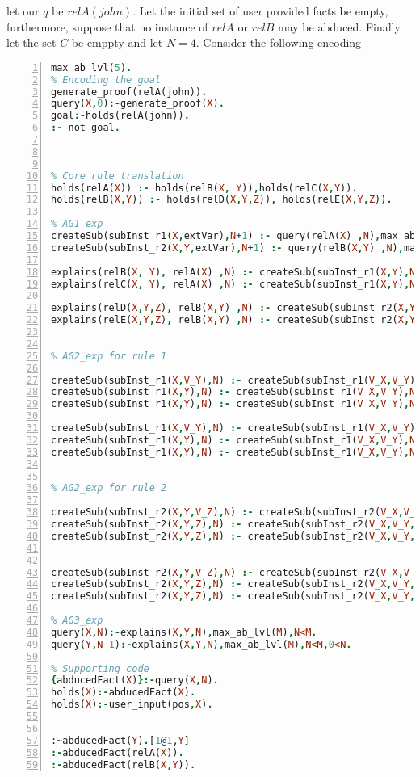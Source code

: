 \documentclass[sigconf]{acmart}
\begin{document}
let our $q$ be $relA(john)$. Let the initial set of user provided facts be empty, furthermore, suppose that no instance of $relA$ or $relB$ may be abduced. Finally let the set $C$ be emppty and let $N=4$.  
Consider the following encoding
\begin{lstlisting}[language=Prolog, numbers=left]
max_ab_lvl(5).
% Encoding the goal
generate_proof(relA(john)).
query(X,0):-generate_proof(X).
goal:-holds(relA(john)).
:- not goal.



% Core rule translation
holds(relA(X)) :- holds(relB(X, Y)),holds(relC(X,Y)).
holds(relB(X,Y)) :- holds(relD(X,Y,Z)), holds(relE(X,Y,Z)).

% AG1_exp
createSub(subInst_r1(X,extVar),N+1) :- query(relA(X) ,N),max_ab_lvl(M),N<M-1.
createSub(subInst_r2(X,Y,extVar),N+1) :- query(relB(X,Y) ,N),max_ab_lvl(M),N<M-1.

explains(relB(X, Y), relA(X) ,N) :- createSub(subInst_r1(X,Y),N).
explains(relC(X, Y), relA(X) ,N) :- createSub(subInst_r1(X,Y),N).

explains(relD(X,Y,Z), relB(X,Y) ,N) :- createSub(subInst_r2(X,Y,Z),N).
explains(relE(X,Y,Z), relB(X,Y) ,N) :- createSub(subInst_r2(X,Y,Z),N).


% AG2_exp for rule 1

createSub(subInst_r1(X,V_Y),N) :- createSub(subInst_r1(V_X,V_Y),N), holds(relA(X)).
createSub(subInst_r1(X,Y),N) :- createSub(subInst_r1(V_X,V_Y),N), holds(relB(X,Y)).
createSub(subInst_r1(X,Y),N) :- createSub(subInst_r1(V_X,V_Y),N), holds(relC(X,Y)).

createSub(subInst_r1(X,V_Y),N) :- createSub(subInst_r1(V_X,V_Y),N), query(relA(X),N-1),0<N.
createSub(subInst_r1(X,Y),N) :- createSub(subInst_r1(V_X,V_Y),N), query(relB(X,Y),N).
createSub(subInst_r1(X,Y),N) :- createSub(subInst_r1(V_X,V_Y),N), query(relC(X,Y),N).


% AG2_exp for rule 2

createSub(subInst_r2(X,Y,V_Z),N) :- createSub(subInst_r2(V_X,V_Y,V_Z),N), holds(relB(X,Y)).
createSub(subInst_r2(X,Y,Z),N) :- createSub(subInst_r2(V_X,V_Y,V_Z),N), holds(relD(X,Y,Z)).
createSub(subInst_r2(X,Y,Z),N) :- createSub(subInst_r2(V_X,V_Y,V_Z),N), holds(relE(X,Y,Z)).


createSub(subInst_r2(X,Y,V_Z),N) :- createSub(subInst_r2(V_X,V_Y,V_Z),N), query(relB(X,Y),N-1),0<N.
createSub(subInst_r2(X,Y,Z),N) :- createSub(subInst_r2(V_X,V_Y,V_Z),N), query(relD(X,Y,Z),N).
createSub(subInst_r2(X,Y,Z),N) :- createSub(subInst_r2(V_X,V_Y,V_Z),N), query(relE(X,Y,Z),N).

% AG3_exp
query(X,N):-explains(X,Y,N),max_ab_lvl(M),N<M.
query(Y,N-1):-explains(X,Y,N),max_ab_lvl(M),N<M,0<N.

% Supporting code
{abducedFact(X)}:-query(X,N).
holds(X):-abducedFact(X).
holds(X):-user_input(pos,X).


:~abducedFact(Y).[1@1,Y]
:-abducedFact(relA(X)).
:-abducedFact(relB(X,Y)).

\end{lstlisting}
\end{document}
